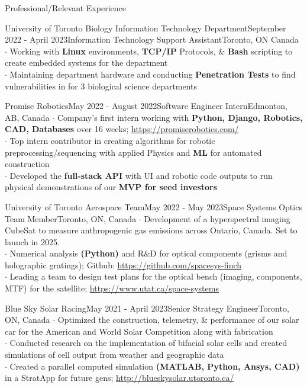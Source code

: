 \documentclass[UTF8]{resume} %
\begin{document}
\begin{rSection}{Professional/Relevant Experience}
\begin{rSubsection}{University of Toronto Biology Information Technology Department}{September 2022 - April 2023}{Information Technology Support Assistant}{Toronto, ON Canada}
    $\cdot$ Working with \textbf{Linux} environments, \textbf{TCP/IP} Protocols, \& \textbf{Bash} scripting to create embedded systems for the department \\
    $\cdot$ Maintaining department hardware and conducting \textbf{Penetration Tests} to find vulnerabilities in for 3 biological science departments
\end{rSubsection}
\begin{rSubsection}{Promise Robotics}{May 2022 - August 2022}{Software Engineer Intern}{Edmonton, AB, Canada}
    $\cdot$ Company's first intern working with \textbf{Python, Django, Robotics, CAD, Databases} over 16 weeks; \href{https://promiserobotics.com/}{https://promiserobotics.com/}\\
    $\cdot$ Top intern contributor in creating algorithms for robotic preprocessing/sequencing with applied Physics and \textbf{ML} for automated construction  \\
    $\cdot$ Developed the \textbf{full-stack API} with UI and robotic code outputs to run physical demonstrations of our \textbf{MVP for seed investors}
\end{rSubsection}
\begin{rSubsection}{University of Toronto Aerospace Team}{May 2022 - May 2023}{Space Systems Optics Team Member}{Toronto, ON, Canada}
    $\cdot$ Development of a hyperspectral imaging CubeSat to measure anthropogenic gas emissions across Ontario, Canada. Set to launch in 2025. \\
    $\cdot$ Numerical analysis \textbf{(Python)} and R\&D for optical components (grisms and holographic gratings); Github: \href{https://github.com/spacesys-finch}{https://github.com/spacesys-finch}\\
    $\cdot$ Leading a team to design test plans for the optical bench (imaging, components, MTF) for the satellite; \href{https://www.utat.ca/space-systems}{https://www.utat.ca/space-systems}
\end{rSubsection}
\begin{rSubsection}{Blue Sky Solar Racing}{May 2021 - April 2023}{Senior Strategy Engineer}{Toronto, ON, Canada}
    $\cdot$ Optimized the construction, telemetry, \& performance of our solar car for the American and World Solar Competition along with fabrication\\
    $\cdot$ Conducted research on the implementation of bifacial solar cells and created simulations of cell output from weather and geographic data\\
    $\cdot$ Created a parallel computed simulation \textbf{(MATLAB, Python, Ansys, CAD)} in a StratApp for future gens; \href{http://blueskysolar.utoronto.ca/}{http://blueskysolar.utoronto.ca/}
\end{rSubsection}
\end{rSection}
\end{document}
